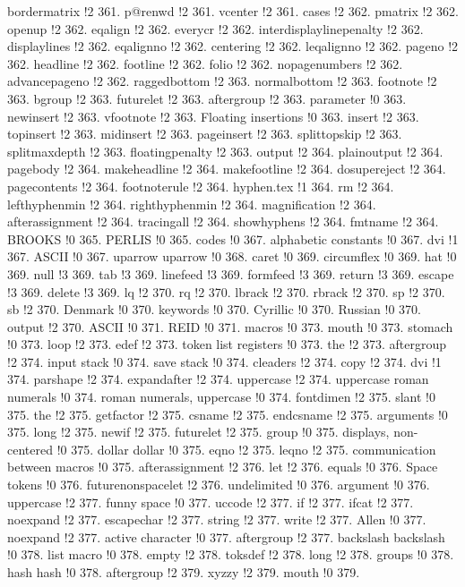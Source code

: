 bordermatrix !2 361.
p@renwd !2 361.
vcenter !2 361.
cases !2 362.
pmatrix !2 362.
openup !2 362.
eqalign !2 362.
everycr !2 362.
interdisplaylinepenalty !2 362.
displaylines !2 362.
eqalignno !2 362.
centering !2 362.
leqalignno !2 362.
pageno !2 362.
headline !2 362.
footline !2 362.
folio !2 362.
nopagenumbers !2 362.
advancepageno !2 362.
raggedbottom !2 363.
normalbottom !2 363.
footnote !2 363.
bgroup !2 363.
futurelet !2 363.
aftergroup !2 363.
parameter !0 363.
newinsert !2 363.
vfootnote !2 363.
Floating insertions !0 363.
insert !2 363.
topinsert !2 363.
midinsert !2 363.
pageinsert !2 363.
splittopskip !2 363.
splitmaxdepth !2 363.
floatingpenalty !2 363.
output !2 364.
plainoutput !2 364.
pagebody !2 364.
makeheadline !2 364.
makefootline !2 364.
dosupereject !2 364.
pagecontents !2 364.
footnoterule !2 364.
hyphen.tex !1 364.
rm !2 364.
lefthyphenmin !2 364.
righthyphenmin !2 364.
magnification !2 364.
afterassignment !2 364.
tracingall !2 364.
showhyphens !2 364.
fmtname !2 364.
BROOKS !0 365.
PERLIS !0 365.
codes !0 367.
alphabetic constants !0 367.
dvi !1 367.
ASCII !0 367.
uparrow uparrow !0 368.
caret !0 369.
circumflex !0 369.
hat !0 369.
null !3 369.
tab !3 369.
linefeed !3 369.
formfeed !3 369.
return !3 369.
escape !3 369.
delete !3 369.
lq !2 370.
rq !2 370.
lbrack !2 370.
rbrack !2 370.
sp !2 370.
sb !2 370.
Denmark !0 370.
keywords !0 370.
Cyrillic !0 370.
Russian !0 370.
output !2 370.
ASCII !0 371.
REID !0 371.
macros !0 373.
mouth !0 373.
stomach !0 373.
loop !2 373.
edef !2 373.
token list registers !0 373.
the !2 373.
aftergroup !2 374.
input stack !0 374.
save stack !0 374.
cleaders !2 374.
copy !2 374.
dvi !1 374.
parshape !2 374.
expandafter !2 374.
uppercase !2 374.
uppercase roman numerals !0 374.
roman numerals, uppercase !0 374.
fontdimen !2 375.
slant !0 375.
the !2 375.
getfactor !2 375.
csname !2 375.
endcsname !2 375.
arguments !0 375.
long !2 375.
newif !2 375.
futurelet !2 375.
group !0 375.
displays, non-centered !0 375.
dollar dollar !0 375.
eqno !2 375.
leqno !2 375.
communication between macros !0 375.
afterassignment !2 376.
let !2 376.
equals !0 376.
Space tokens !0 376.
futurenonspacelet !2 376.
undelimited !0 376.
argument !0 376.
uppercase !2 377.
funny space !0 377.
uccode !2 377.
if !2 377.
ifcat !2 377.
noexpand !2 377.
escapechar !2 377.
string !2 377.
write !2 377.
Allen !0 377.
noexpand !2 377.
active character !0 377.
aftergroup !2 377.
backslash backslash !0 378.
list macro !0 378.
empty !2 378.
toksdef !2 378.
long !2 378.
groups !0 378.
hash hash !0 378.
aftergroup !2 379.
xyzzy !2 379.
mouth !0 379.
